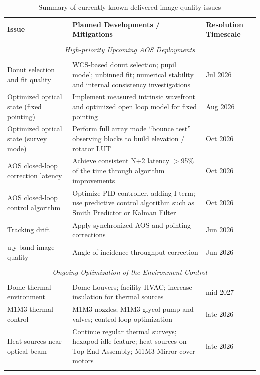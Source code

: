 \documentclass[SO,lsst,authoryear,toc]{lsstdoc}
\begin{document}
\begin{table}
\footnotesize
\centering
\caption{Summary of currently known delivered image quality issues}
\label{tab:issues}
\begin{tabular}{p{4.5cm} p{9cm} p{1.5cm}}
\hline
\textbf{Issue} & \textbf{Planned Developments / Mitigations} & \textbf{Resolution Timescale} \\
\hline
 & & \\
\multicolumn{3}{c}{\emph{High-priority Upcoming AOS Deployments}} \\
 & & \\
\hline
Donut selection and fit quality & WCS-based donut selection; pupil model; unbinned fit; numerical stability and internal consistency investigations & Jul 2026 \\
\hline
Optimized optical state (fixed pointing) & Implement measured intrinsic wavefront and optimized open loop model for fixed pointing & Aug 2026 \\
\hline
Optimized optical state (survey mode) & Perform full array mode ``bounce test'' observing blocks to build elevation / rotator LUT & Oct 2026 \\
\hline
AOS closed-loop correction latency & Achieve consistent N+2 latency $>$95\% of the time through algorithm improvements & Oct 2026 \\
\hline
AOS closed-loop control algorithm & Optimize PID controller, adding I term; use predictive control algorithm such as Smith Predictor or Kalman Filter & Oct 2026 \\
\hline
Tracking drift & Apply synchronized AOS and pointing corrections & Jun 2026 \\
\hline
u,y band image quality & Angle-of-incidence throughput correction & Jun 2026 \\
\hline
 & & \\
\multicolumn{3}{c}{\emph{Ongoing Optimization of the Environment Control}} \\
 & & \\
\hline
Dome thermal environment & Dome Louvers; facility HVAC; increase insulation for thermal sources & mid 2027 \\
\hline
M1M3 thermal control & M1M3 nozzles; M1M3 glycol pump and valves; control loop optimization & late 2026 \\
\hline
Heat sources near optical beam & Continue regular thermal surveys; hexapod idle feature; heat sources on Top End Assembly; M1M3 Mirror cover motors & late 2026 \\
\hline
 & & \\

\end{tabular}
\end{table}
\end{document}
